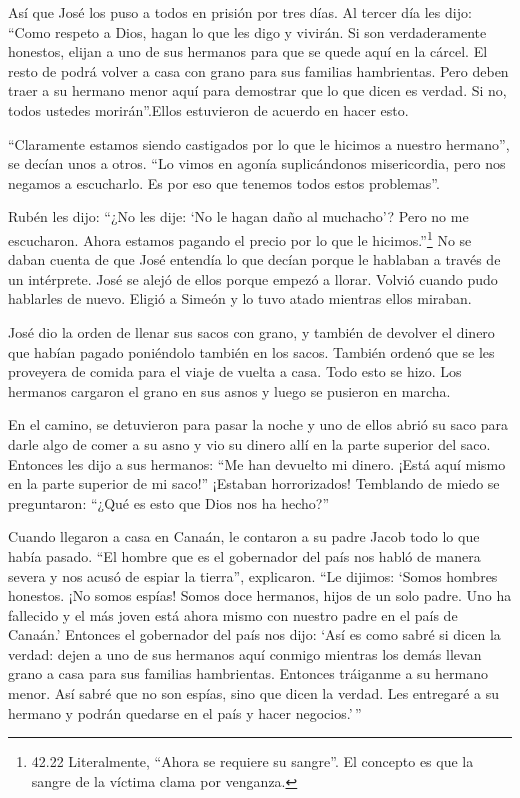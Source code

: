  Así que José los puso a todos en prisión por tres días.
 Al tercer día les dijo: ``Como respeto a Dios, hagan lo
que les digo y vivirán.  Si son verdaderamente honestos,
elijan a uno de sus hermanos para que se quede aquí en la cárcel. El
resto de podrá volver a casa con grano para sus familias hambrientas.
 Pero deben traer a su hermano menor aquí para demostrar
que lo que dicen es verdad. Si no, todos ustedes morirán''.Ellos
estuvieron de acuerdo en hacer esto.

 ``Claramente estamos siendo castigados por lo que le
hicimos a nuestro hermano'', se decían unos a otros. ``Lo vimos en
agonía suplicándonos misericordia, pero nos negamos a escucharlo. Es por
eso que tenemos todos estos problemas''.

 Rubén les dijo: ``¿No les dije: `No le hagan daño al
muchacho'? Pero no me escucharon. Ahora estamos pagando el precio por lo
que le hicimos.''\footnote{42.22 Literalmente, ``Ahora se requiere su
  sangre''. El concepto es que la sangre de la víctima clama por
  venganza.}  No se daban cuenta de que José entendía lo
que decían porque le hablaban a través de un intérprete. 
José se alejó de ellos porque empezó a llorar. Volvió cuando pudo
hablarles de nuevo. Eligió a Simeón y lo tuvo atado mientras ellos
miraban.

 José dio la orden de llenar sus sacos con grano, y también
de devolver el dinero que habían pagado poniéndolo también en los sacos.
También ordenó que se les proveyera de comida para el viaje de vuelta a
casa. Todo esto se hizo.  Los hermanos cargaron el grano en
sus asnos y luego se pusieron en marcha.

 En el camino, se detuvieron para pasar la noche y uno de
ellos abrió su saco para darle algo de comer a su asno y vio su dinero
allí en la parte superior del saco.  Entonces les dijo a
sus hermanos: ``Me han devuelto mi dinero. ¡Está aquí mismo en la parte
superior de mi saco!'' ¡Estaban horrorizados! Temblando de miedo se
preguntaron: ``¿Qué es esto que Dios nos ha hecho?''

 Cuando llegaron a casa en Canaán, le contaron a su padre
Jacob todo lo que había pasado.  ``El hombre que es el
gobernador del país nos habló de manera severa y nos acusó de espiar la
tierra'', explicaron.  ``Le dijimos: `Somos hombres
honestos. ¡No somos espías!  Somos doce hermanos, hijos de
un solo padre. Uno ha fallecido y el más joven está ahora mismo con
nuestro padre en el país de Canaán.'  Entonces el
gobernador del país nos dijo: `Así es como sabré si dicen la verdad:
dejen a uno de sus hermanos aquí conmigo mientras los demás llevan grano
a casa para sus familias hambrientas.  Entonces tráiganme a
su hermano menor. Así sabré que no son espías, sino que dicen la verdad.
Les entregaré a su hermano y podrán quedarse en el país y hacer
negocios.'\,''

